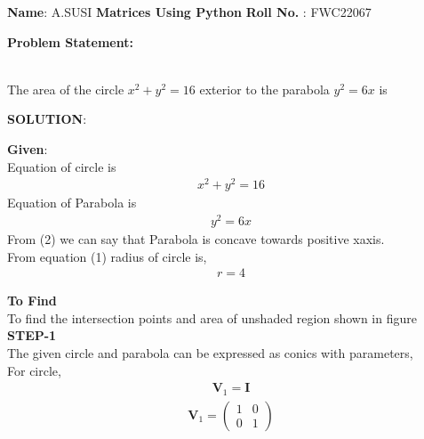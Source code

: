 \documentclass[10pt,a4paper]{report}
\newcommand{\myvec}[1]{\ensuremath{\begin{pmatrix}#1\end{pmatrix}}}
\let\vec\mathbf
\let\vec\mathbf
\begin{document}
\raggedright \textbf{Name}:\hspace{1mm} A.SUSI\hspace{3cm} \Large \textbf{Matrices Using Python}\hspace{2.5cm} %
\normalsize \textbf{Roll No.} :\hspace{1mm} FWC22067\vspace{1cm}
\begin{multicols}{2}

\raggedright \textbf{Problem Statement:}\vspace{2mm}
\raggedright \\The area of the circle $x^2 + y^2 = 16$ exterior to the parabola $y^2 = 6x$ is\\
\vspace{5mm}
\raggedright \textbf{SOLUTION}:\vspace{2mm}\\

\raggedright \textbf{Given}:\vspace{2mm}\\
Equation of circle is \\\vspace{1mm}
\begin{align}
x^2 + y^2 = 16
\end{align}
Equation of Parabola is \\ \vspace{1mm}
\begin{align}
y^2 = 6x 
\end{align}
From (2) we can say that Parabola is concave towards positive xaxis.\\ \vspace{2mm}
From equation (1) radius of circle is,\\ \vspace{1mm}
\begin{align}
r= 4
\end{align}

\textbf{To Find }\vspace{2mm}\\
To find the intersection points and area of unshaded region shown in figure\vspace{2mm}  \\ 
\textbf{STEP-1}\vspace{2mm}\\
The given circle and parabola can be expressed as conics with parameters,\\ \vspace{1mm}
For circle,\\ \vspace{1mm}
\begin{align}
\vec{V}_1=\vec{I}
\end{align}
\begin{align}
\vec{V}_1=\myvec{
1 & 0\\
0 & 1
}
\end{align} 


\end{multicols}
\end{document}
